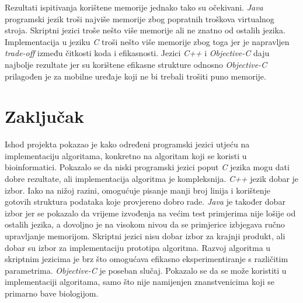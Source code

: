\documentclass[times, utf8, seminar, numeric]{fer}
\begin{document}
Rezultati ispitivanja korištene memorije jednako tako su očekivani. \emph{Java} programski jezik troši najviše memorije zbog popratnih troškova virtualnog stroja. Skriptni jezici troše nešto više memorije ali ne znatno od ostalih jezika. Implementacija u jeziku \emph{C} troši nešto više memorije zbog toga jer je napravljen \emph{trade-off} između čitkosti koda i efikasnosti. Jezici \emph{C++} i \emph{Objective-C} daju najbolje rezultate jer su korištene efikasne strukture odnosno \emph{Objective-C} prilagođen je za mobilne uređaje koji ne bi trebali trošiti puno memorije.

\chapter{Zaključak}

Ishod projekta pokazao je kako određeni programski jezici utjeću na implementaciju algoritama, konkretno na algoritam koji se koristi u bioinformatici. Pokazalo se da niski programski jezici poput \emph{C} jezika mogu dati dobre rezultate, ali implementacija algoritma je kompleksnija. \emph{C++} jezik dobar je izbor. Iako na nižoj razini, omogućuje pisanje manji broj linija i korištenje gotovih struktura podataka koje provjereno dobro rade. \emph{Java} je također dobar izbor jer se pokazalo da vrijeme izvođenja na većim test primjerima nije lošije od ostalih jezika, a dovoljno je na visokom nivou da se primjerice izbjegava ručno upravljanje memorijom. Skriptni jezici nisu dobar izbor za krajnji produkt, ali dobar su izbor za implementaciju prototipa algoritma. Razvoj algoritma u skriptnim jezicima je brz što omogućava efikasno eksperimentiranje s različitim parametrima. \emph{Objective-C} je poseban slučaj. Pokazalo se da se može koristiti u implementaciji algoritama, samo što nije namijenjen znanstvenicima koji se primarno bave biologijom.

\end{document}
